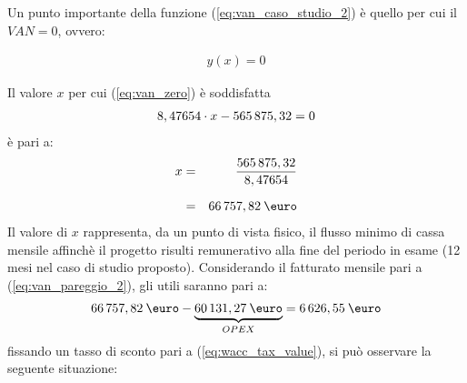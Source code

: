 Un punto importante della funzione (\ref{eq:van_caso_studio_2}) è quello per cui il $ VAN = 0 $, ovvero:

	\begin{equation}
	\label{eq:van_zero}
	\begin{split}
 		y(x) = 0
 	\end{split}
	\end{equation}

Il valore $x$ per cui (\ref{eq:van_zero}) è soddisfatta 
	\begin{equation}
	\label{eq:van_pareggio_1}
	\begin{split}
 		8,47654 \cdot x - 565\thinspace 875,32 = 0	
 	\end{split}
	\end{equation}
è pari a:
	\begin{eqnarray}
	\label{eq:van_pareggio_2}
		x & = & \frac{565\thinspace 875,32	}{8,47654}	 	\nonumber \\[1.5ex] 
		  & = &  66\thinspace 757,82 \: \mbox{\euro} 
	\end{eqnarray}
Il valore di $x$ rappresenta, da un punto di vista fisico, il flusso minimo di cassa mensile affinchè il progetto risulti remunerativo alla fine del periodo in esame (12 mesi nel caso di studio proposto). \newline
Considerando il fatturato mensile pari a (\ref{eq:van_pareggio_2}), gli utili saranno pari a:
	\begin{equation}
	\label{eq:flussi_netti}
	\begin{split}
 		66\thinspace 757,82 \: \mbox{\euro} - \underbrace{60\thinspace 131,27 \: \mbox{\euro}}_{OPEX} = 6\thinspace 626,55 \: \mbox{\euro}	
 	\end{split}
	\end{equation}
fissando un tasso di sconto pari a (\ref{eq:wacc_tax_value}), si può osservare la seguente situazione:
%
%
